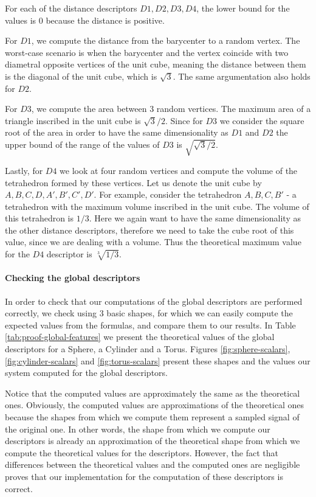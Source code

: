 For each of the distance descriptors $D1, D2, D3, D4$, the lower bound for the values is 0 because the distance is
positive.

For $D1$, we compute the distance from the barycenter to a random vertex.
The worst-case scenario is when the barycenter and the vertex coincide with two diametral opposite vertices of the unit cube, meaning the distance between them is the diagonal of the unit cube, which is $\sqrt{3}$.
The same argumentation also holds for $D2$.

For $D3$, we compute the area between 3 random vertices.
The maximum area of a triangle inscribed in the unit cube is $\sqrt{3}/2$.
Since for $D3$ we consider the square root of the area in order to have the same dimensionality as $D1$ and $D2$ the upper bound of the range of the values of $D3$ is $\sqrt{\sqrt{3} /2 }$.

Lastly, for $D4$ we look at four random vertices and compute the volume of the tetrahedron formed by these vertices.
Let us denote the unit cube by $A, B, C, D, A', B', C', D'$.
For example, consider the tetrahedron $A, B, C, B'$ - a tetrahedron with the maximum volume inscribed in the unit cube.
The volume of this tetrahedron is $1/3$.
Here we again want to have the same dimensionality as the other distance descriptors, therefore we need to take the cube root of this value, since we are dealing with a volume.
Thus the theoretical maximum value for the $D4$ descriptor is $\sqrt[3]{1/3}$.

\paragraph{Checking the global descriptors}
In order to check that our computations of the global descriptors are performed correctly, we check using 3 basic
shapes, for which we can easily compute the expected values from the formulas, and compare them to our results.
In Table \ref{tab:proof-global-features} we present the theoretical values of the global descriptors for a Sphere,
a Cylinder and a Torus.
Figures \ref{fig:sphere-scalars}, \ref{fig:cylinder-scalars} and \ref{fig:torus-scalars} present these shapes and the
values our system computed for the global descriptors.

Notice that the computed values are approximately the same as the theoretical ones.
Obviously, the computed values are approximations of the theoretical ones because the shapes from which we compute them represent a sampled signal of the original one.
In other words, the shape from which we compute our descriptors is already an approximation of the theoretical shape from which we compute the theoretical values for the descriptors.
However, the fact that differences between the theoretical values and the computed ones are negligible proves that our implementation for the computation of these descriptors is correct.

